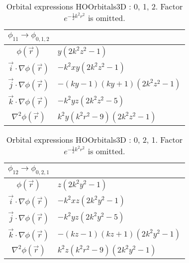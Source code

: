\begin{table}
\begin{center}
\begin{tabular}{c|l}
$\phi_{11} \rightarrow \phi_{0, 1, 2}$\\
\hline
$\phi(\vec r)$ & $y \left(2 k^{2} z^{2} -1\right)$\\
\hline
$\vec i\cdot \nabla \phi(\vec r)$ & $- k^{2} x y \left(2 k^{2} z^{2} -1\right)$\\
$\vec j\cdot \nabla \phi(\vec r)$ & $- \left(k y -1\right) \left(k y + 1\right) \left(2 k^{2} z^{2} -1\right)$\\
$\vec k\cdot \nabla \phi(\vec r)$ & $- k^{2} y z \left(2 k^{2} z^{2} -5\right)$\\
\hline
$\nabla^2 \phi(\vec r)$ & $k^{2} y \left(k^{2} r^{2} -9\right) \left(2 k^{2} z^{2} -1\right)$\\
\end{tabular}
\caption{Orbital expressions HOOrbitals3D : 0, 1, 2. Factor $e^{- \frac{1}{2} k^{2} r^{2}}$ is omitted.}
\end{center}
\end{table}


\begin{table}
\begin{center}
\begin{tabular}{c|l}
$\phi_{12} \rightarrow \phi_{0, 2, 1}$\\
\hline
$\phi(\vec r)$ & $z \left(2 k^{2} y^{2} -1\right)$\\
\hline
$\vec i\cdot \nabla \phi(\vec r)$ & $- k^{2} x z \left(2 k^{2} y^{2} -1\right)$\\
$\vec j\cdot \nabla \phi(\vec r)$ & $- k^{2} y z \left(2 k^{2} y^{2} -5\right)$\\
$\vec k\cdot \nabla \phi(\vec r)$ & $- \left(k z -1\right) \left(k z + 1\right) \left(2 k^{2} y^{2} -1\right)$\\
\hline
$\nabla^2 \phi(\vec r)$ & $k^{2} z \left(k^{2} r^{2} -9\right) \left(2 k^{2} y^{2} -1\right)$\\
\end{tabular}
\caption{Orbital expressions HOOrbitals3D : 0, 2, 1. Factor $e^{- \frac{1}{2} k^{2} r^{2}}$ is omitted.}
\end{center}
\end{table}


